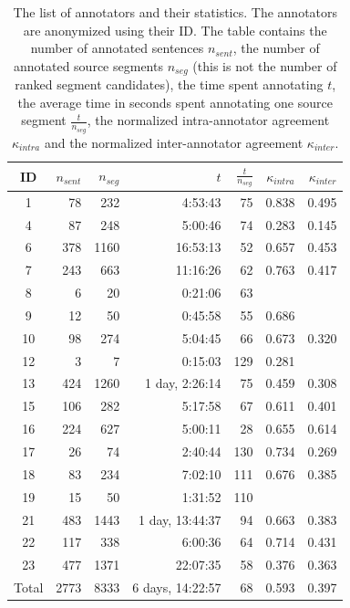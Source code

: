\begin{table}
    \begin{center}
        \begin{tabular}{|c|r|r|r|r|r|r|}
\hline
ID & $n_{sent}$ & $n_{seg}$ & $t$ & $\frac{t}{n_{seg}}$ & $\kappa_{intra}$ & $\kappa_{inter}$ \\
\hline
1 & 78 & 232 & 4:53:43 &  75 & 0.838 & 0.495 \\
4 & 87 & 248 & 5:00:46 &  74 & 0.283 & 0.145 \\
6 & 378 & 1160 & 16:53:13 & 52 & 0.657 & 0.453 \\
7 & 243 & 663 & 11:16:26 &  62 & 0.763 & 0.417 \\
8 & 6 & 20 & 0:21:06 &  63 & & \\
9 & 12 & 50 & 0:45:58 &  55 & 0.686 & \\
10 & 98 & 274 & 5:04:45 &  66 & 0.673 & 0.320 \\
12 & 3 & 7 & 0:15:03 &  129 & 0.281 & \\
13 & 424 & 1260 & 1 day, 2:26:14 &  75 & 0.459 & 0.308 \\
15 & 106 & 282 & 5:17:58 &  67 & 0.611 & 0.401 \\
16 & 224 & 627 & 5:00:11 &  28 & 0.655 & 0.614 \\
17 & 26 & 74 & 2:40:44 &  130 & 0.734 & 0.269 \\
18 & 83 & 234 & 7:02:10 &  111 & 0.676 & 0.385 \\
19 & 15 & 50 & 1:31:52 &  110 & & \\
21 & 483 & 1443 & 1 day, 13:44:37 &  94 & 0.663 & 0.383 \\
22 & 117 & 338 & 6:00:36 &  64 & 0.714 & 0.431 \\
23 & 477 & 1371 & 22:07:35 &  58 & 0.376 & 0.363 \\
\hline
Total & 2773 & 8333 & 6 days, 14:22:57 &  68 & 0.593 & 0.397 \\
\hline
        \end{tabular}
    \end{center}

    \caption[A list of annotators and their statistics]{The list of annotators
      and their statistics. The annotators are anonymized using their ID. The
      table contains the number of annotated sentences $n_{sent}$, the number
      of annotated source segments $n_{seg}$ (this is not the number of ranked
      segment candidates), the time spent annotating $t$, the average time in
      seconds spent annotating one source segment $\frac{t}{n_{seg}}$, the
      normalized intra-annotator agreement $\kappa_{intra}$ and the normalized
      inter-annotator agreement $\kappa_{inter}$. }

    \label{big-table}
\end{table}

